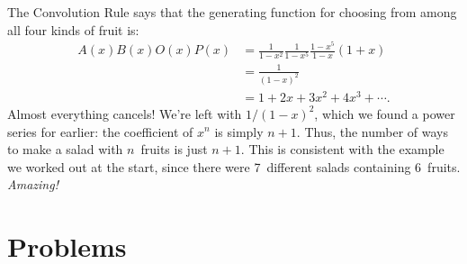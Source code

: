 The Convolution Rule says that the generating function for choosing
from among all four kinds of fruit is:
%
\begin{align*}
A(x) B(x) O(x) P(x)
    & = \frac{1}{1-x^2} \frac{1}{1-x^5} \frac{1-x^5}{1-x} (1 + x) \\
    & = \frac{1}{(1-x)^2} \\
    & = 1 + 2x + 3x^2 + 4 x^3 + \cdots.
\end{align*}
%
Almost everything cancels!  We're left with $1 / (1-x)^2$, which we
found a power series for earlier: the coefficient of $x^n$ is simply
$n+1$.  Thus, the number of ways to make a salad with $n$~fruits is
just $n+1$.  This is consistent with the example we worked out at the
start, since there were 7~different salads containing 6~fruits.
\emph{Amazing!}

\begin{problems}
\practiceproblems
{}

\homeworkproblems
{}



\examproblems
{}

\end{problems}

\section{Problems}

\endinput
